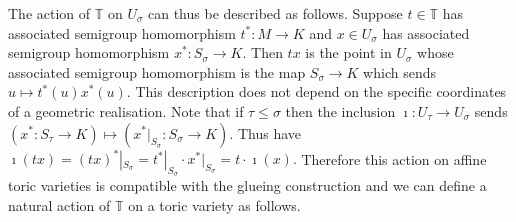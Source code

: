 \documentclass[BSc]{usydthesis}
\numberwithin{equation}{chapter}
\theoremstyle{remark}
\newcommand{\T}{\mathbb{T}}
\begin{document}
The action of $\T$ on $U_{\sigma}$ can thus be described as follows. Suppose $t\in \T$ has associated semigroup homomorphism $t^*:M\to K$ and $x\in U_{\sigma}$ has associated semigroup homomorphism $x^*:S_{\sigma} \to K.$ Then $tx$ is the point in $U_{\sigma}$ whose associated semigroup homomorphism is the map $S_{\sigma} \to K$ which sends $u\mapsto t^*(u) x^*(u).$ This description does not depend on the specific coordinates of a geometric realisation. Note that if $\tau \leq \sigma$ then the inclusion $\imath: U_{\tau} \to U_{\sigma}$ sends $( x^*:S_{\tau} \to K ) \mapsto (x^*|_{S_{\sigma}} : S_{\sigma} \to K ).$ Thus have $\imath(tx) = (tx)^*|_{S_{\sigma}} = t^*|_{S_{\sigma}} \cdot x^*|_{S_{\sigma}} = t \cdot \imath(x).$ Therefore this action on affine toric varieties is compatible with the glueing construction and we can define a natural action of $\T$ on a toric variety as follows. 
\end{document}
